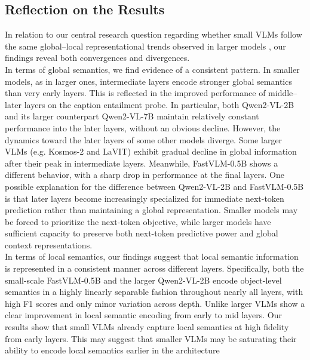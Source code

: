 \documentclass[11pt]{article}
\begin{document}
\subsection{Reflection on the Results}
In relation to our central research question regarding whether small VLMs follow the same global–local representational trends observed in larger models \cite{tao2024probingmultimodallargelanguage},
our findings reveal both convergences and divergences.\\
In terms of global semantics, we find evidence of a consistent pattern.
In smaller models, as in larger ones, intermediate layers encode stronger global semantics than very early layers.
This is reflected in the improved performance of middle–later layers on the caption entailment probe.
In particular, both Qwen2-VL-2B and its larger counterpart Qwen2-VL-7B maintain relatively constant performance into the later layers, without an obvious decline.
However, the dynamics toward the later layers of some other models diverge.
Some larger VLMs (e.g. Kosmos-2 and LaVIT) exhibit gradual decline in global information after their peak in intermediate layers.
Meanwhile, FastVLM-0.5B shows a different behavior, with a sharp drop in performance at the final layers.
One possible explanation for the difference between Qwen2-VL-2B and FastVLM-0.5B is that later layers become increasingly specialized for immediate next-token prediction rather than maintaining a global representation.
Smaller models may be forced to prioritize the next-token objective, while larger models have sufficient capacity to preserve both next-token predictive power and global context representations.\\
In terms of local semantics, our findings suggest that local semantic information is represented in a consistent manner across different layers.
Specifically, both the small-scale FastVLM-0.5B and the larger Qwen2-VL-2B encode object-level semantics in a highly linearly separable fashion throughout nearly all layers, with high F1 scores and only minor variation across depth.
Unlike larger VLMs show a clear improvement in local semantic encoding from early to mid layers. Our results show that small VLMs already capture local semantics at high fidelity from early layers.
This may suggest that smaller VLMs may be saturating their ability to encode local semantics earlier in the architecture
\end{document}
